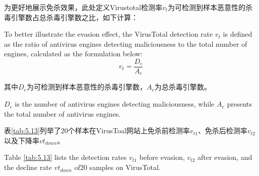 为更好地展示免杀效果，此处定义Virustotal检测率$v_t$为可检测到样本恶意性的杀毒引擎数占总杀毒引擎数之比，如下计算： 

To better illustrate the evasion effect, the VirusTotal detection rate $v_t$ is defined as the ratio of antivirus engines detecting maliciousness to the total number of engines, calculated as the formulation below:
\begin{equation}
v_t = \frac{D_e}{A_e}
\tag{5.9}
\end{equation}

其中$D_e$为可检测到样本恶意性的杀毒引擎数，$A_e$为总杀毒引擎数。

$D_e$ is the number of antivirus engines detecting maliciousness, while $A_e$ presents the total number of antivirus engines.

表\ref{tab:5.13}列举了20个样本在VirusToal网站上免杀前检测率$v_{t1}$、免杀后检测率$v_{t2}$以及下降率$vt_{down}$。

Table \ref{tab:5.13} lists the detection rates $v_{t1}$ before evasion, $v_{t2}$ after evasion, and the decline rate $vt_{down}$ of20 samples on VirusTotal.


